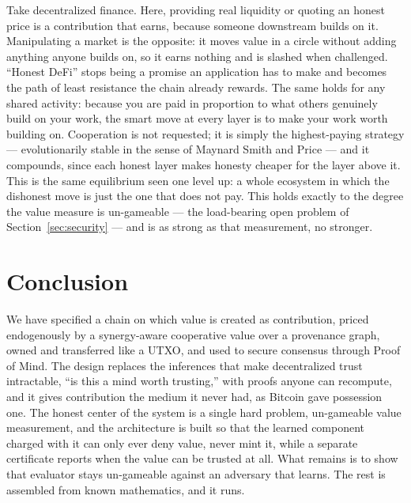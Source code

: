 \documentclass[10pt]{article}
\begin{document}
Take decentralized finance. Here, providing real liquidity or quoting an honest price is a contribution
that earns, because someone downstream builds on it. Manipulating a market is the opposite: it moves
value in a circle without adding anything anyone builds on, so it earns nothing and is slashed when
challenged. ``Honest DeFi'' stops being a promise an application has to make and becomes the path of
least resistance the chain already rewards. The same holds for any shared activity: because you are paid
in proportion to what others genuinely build on your work, the smart move at every layer is to make your
work worth building on. Cooperation is not requested; it is simply the highest-paying strategy ---
evolutionarily stable in the sense of Maynard Smith and Price --- and it compounds, since each honest
layer makes honesty cheaper for the layer above it. This is the same
equilibrium seen one level up: a whole ecosystem in which the dishonest move is just the one that does
not pay. This holds exactly to the degree the value measure is un-gameable --- the load-bearing open
problem of Section~\ref{sec:security} --- and is as strong as that measurement, no stronger.

\section{Conclusion}

We have specified a chain on which value is created as contribution, priced endogenously by a
synergy-aware cooperative value over a provenance graph, owned and transferred like a UTXO, and used to
secure consensus through Proof of Mind. The design replaces the inferences that make decentralized
trust intractable, ``is this a mind worth trusting,'' with proofs anyone can recompute, and it gives
contribution the medium it never had, as Bitcoin gave possession one. The honest center of the system is a single
hard problem, un-gameable value measurement, and the architecture is built so that the learned
component charged with it can only ever deny value, never mint it, while a separate certificate reports
when the value can be trusted at all. What remains is to show that evaluator stays un-gameable against an
adversary that learns. The rest is assembled from known mathematics, and it runs.
\end{document}
